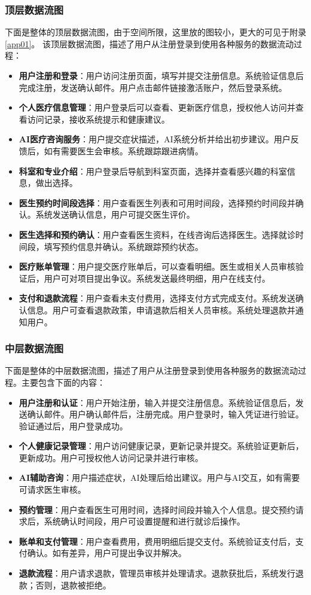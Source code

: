 \subsubsection{顶层数据流图}
下面是整体的顶层数据流图，由于空间所限，这里放的图较小，更大的可见于附录\ref{app01}。
该顶层数据流图，描述了用户从注册登录到使用各种服务的数据流动过程：
\begin{itemize}
	\item \textbf{用户注册和登录}：用户访问注册页面，填写并提交注册信息。系统验证信息后完成注册，发送确认邮件。用户点击邮件链接激活账户，然后登录系统。
	\item \textbf{个人医疗信息管理}：用户登录后可以查看、更新医疗信息，授权他人访问并查看访问记录，接收系统提示和健康建议。
	\item \textbf{AI医疗咨询服务}：用户提交症状描述，AI系统分析并给出初步建议。用户反馈后，如有需要医生会审核。系统跟踪跟进病情。
	\item \textbf{科室和专业介绍}：用户登录后导航到科室页面，选择并查看感兴趣的科室信息，做出选择。
	\item \textbf{医生预约时间段选择}：用户查看医生列表和可用时间段，选择预约时间段并确认。系统发送确认信息，用户可提交医生评价。
	\item \textbf{医生选择和预约确认}：用户查看医生资料，在线咨询后选择医生。选择就诊时间段，填写预约信息并确认。系统跟踪预约状态。
	\item \textbf{医疗账单管理}：用户提交医疗账单后，可以查看明细。医生或相关人员审核验证后，用户可对项目提出争议。系统发送最终明细，用户在线支付。
	\item \textbf{支付和退款流程}：用户查看未支付费用，选择支付方式完成支付。系统发送确认信息。用户可查看退款政策，申请退款后相关人员审核。系统处理退款并通知用户。
\end{itemize}

\subsubsection{中层数据流图}
下面是整体的中层数据流图，描述了用户从注册登录到使用各种服务的数据流动过程。主要包含下面的内容：
\begin{itemize}
	\item \textbf{用户注册和认证}：用户开始注册，输入并提交注册信息。系统验证信息后，发送确认邮件。用户确认邮件后，注册完成。用户登录时，输入凭证进行验证。验证通过后，用户登录成功。
	\item \textbf{个人健康记录管理}：用户访问健康记录，更新记录并提交。系统验证更新后，更新成功。用户可授权他人访问记录并进行审核。
	\item \textbf{AI辅助咨询}：用户描述症状，AI处理后给出建议。用户与AI交互，如有需要可请求医生审核。
	\item \textbf{预约管理}：用户查看医生可用时间，选择时间段并输入个人信息。提交预约请求后，系统确认时间段，用户可设置提醒和进行就诊后操作。
	\item \textbf{账单和支付管理}：用户查看费用，费用明细后提交支付。系统验证支付后，支付确认。如有差异，用户可提出争议并解决。
	\item \textbf{退款流程}：用户请求退款，管理员审核并处理请求。退款获批后，系统发行退款；否则，退款被拒绝。
\end{itemize}


